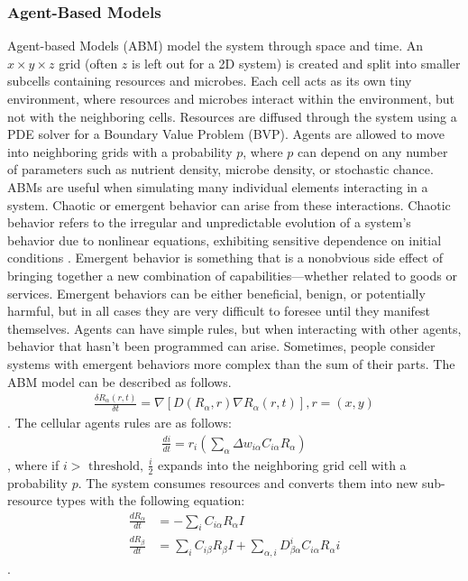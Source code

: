 \subsubsection{Agent-Based Models}
Agent-based Models (ABM) model the system through space and time. An $x \times y \times z$ grid (often $z$ is left out for a 2D system) is created and split into smaller subcells containing resources and microbes. Each cell acts as its own tiny environment, where resources and microbes interact within the environment, but not with the neighboring cells. Resources are diffused through the system using a PDE solver for a Boundary Value Problem (BVP). Agents are allowed to move into neighboring grids with a probability $p$, where $p$ can depend on any number of parameters such as nutrient density, microbe density, or stochastic chance. \newline 
ABMs are useful when simulating many individual elements interacting in a system. Chaotic or emergent behavior can arise from these interactions. Chaotic behavior refers to the irregular and unpredictable evolution of a system's behavior due to nonlinear equations, exhibiting sensitive dependence on initial conditions \cite{encyclopedia_of_physical_science_and_technology}. \newline 
Emergent behavior is something that is a nonobvious side effect of bringing together a new combination of capabilities—whether related to goods or services. Emergent behaviors can be either beneficial, benign, or potentially harmful, but in all cases they are very difficult to foresee until they manifest themselves. Agents can have simple rules, but when interacting with other agents, behavior that hasn't been programmed can arise. Sometimes, people consider systems with emergent behaviors more complex than the sum of their parts.
The ABM model can be described as follows.
\begin{align} 
    \frac{\delta R_\alpha(r, t)}{\delta t} = \nabla \left[D \left( R_\alpha, r\right) \nabla R_\alpha \left( r, t \right) \right], r = \left(x, y\right)
\end{align}. 
The cellular agents rules are as follows: 
\begin{align} 
    \frac{di}{dt} = r_i \left( \sum_\alpha \Delta w_{i\alpha}C_{i\alpha}R_\alpha\right)
\end{align}, where if $i> \text{ threshold, }\frac{i}{2}$ expands into the neighboring grid cell with a probability $p$. 
The system consumes resources and converts them into new sub-resource types with the following equation:
\begin{align}    
    \frac{dR_\alpha}{dt} &= -\sum_i C_{i\alpha}R_\alpha I \\
    \frac{dR_\beta}{dt} &= \sum_i C_{i\beta}R_\beta I + \sum_{\alpha, i}D_{\beta \alpha}^{i} C_{i \alpha} R_\alpha i
\end{align}. 






